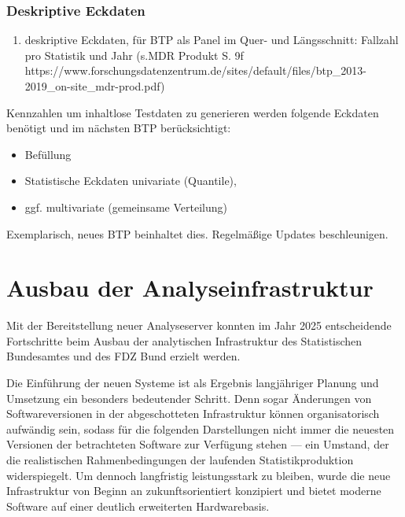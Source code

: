 \documentclass[
  german,
  10pt,
  twoside]{article}
\providecommand{\tightlist}{%
  \setlength{\itemsep}{0pt}\setlength{\parskip}{0pt}}
\begin{document}
\subsubsection{Deskriptive Eckdaten}\label{deskriptive-eckdaten}

\begin{enumerate}
\def\labelenumi{\arabic{enumi}.}
\tightlist
\item
  deskriptive Eckdaten, für BTP als Panel im Quer- und Längsschnitt:
  Fallzahl pro Statistik und Jahr (s.MDR Produkt S. 9f
  https://www.forschungsdatenzentrum.de/sites/default/files/btp\_2013-2019\_on-site\_mdr-prod.pdf)
\end{enumerate}

Kennzahlen um inhaltlose Testdaten zu generieren werden folgende
Eckdaten benötigt und im nächsten BTP berücksichtigt:

\begin{itemize}
\tightlist
\item
  Befüllung
\item
  Statistische Eckdaten univariate (Quantile),
\item
  ggf. multivariate (gemeinsame Verteilung)
\end{itemize}

Exemplarisch, neues BTP beinhaltet dies. Regelmäßige Updates
beschleunigen.

\section{Ausbau der Analyseinfrastruktur}\label{sec-infrastruktur}

Mit der Bereitstellung neuer Analyseserver konnten im Jahr 2025
entscheidende Fortschritte beim Ausbau der analytischen Infrastruktur
des Statistischen Bundesamtes und des FDZ Bund erzielt werden.

Die Einführung der neuen Systeme ist als Ergebnis langjähriger Planung
und Umsetzung ein besonders bedeutender Schritt. Denn sogar Änderungen
von Softwareversionen in der abgeschotteten Infrastruktur können
organisatorisch aufwändig sein, sodass für die folgenden Darstellungen
nicht immer die neuesten Versionen der betrachteten Software zur
Verfügung stehen --- ein Umstand, der die realistischen
Rahmenbedingungen der laufenden Statistikproduktion widerspiegelt. Um
dennoch langfristig leistungsstark zu bleiben, wurde die neue
Infrastruktur von Beginn an zukunftsorientiert konzipiert und bietet
moderne Software auf einer deutlich erweiterten Hardwarebasis.
\end{document}
